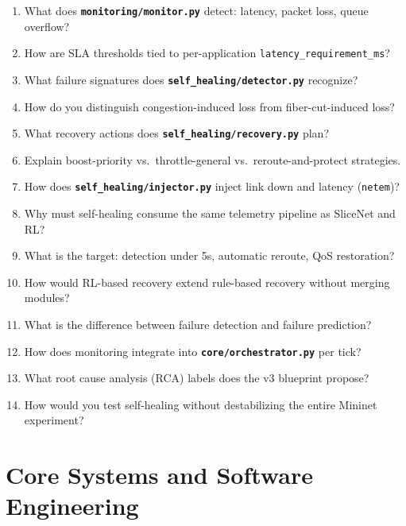 \documentclass[11pt,a4paper]{article}
\newcommand{\proj}[1]{\textbf{\texttt{#1}}}
\begin{document}
\begin{enumerate}
    \item What does \proj{monitoring/monitor.py} detect: latency, packet loss, queue overflow?
    \item How are SLA thresholds tied to per-application \texttt{latency\_requirement\_ms}?
    \item What failure signatures does \proj{self\_healing/detector.py} recognize?
    \item How do you distinguish congestion-induced loss from fiber-cut-induced loss?
    \item What recovery actions does \proj{self\_healing/recovery.py} plan?
    \item Explain boost-priority vs.\ throttle-general vs.\ reroute-and-protect strategies.
    \item How does \proj{self\_healing/injector.py} inject link down and latency (\texttt{netem})?
    \item Why must self-healing consume the same telemetry pipeline as SliceNet and RL?
    \item What is the target: detection under 5s, automatic reroute, QoS restoration?
    \item How would RL-based recovery extend rule-based recovery without merging modules?
    \item What is the difference between failure detection and failure prediction?
    \item How does monitoring integrate into \proj{core/orchestrator.py} per tick?
    \item What root cause analysis (RCA) labels does the v3 blueprint propose?
    \item How would you test self-healing without destabilizing the entire Mininet experiment?
\end{enumerate}

\section{Core Systems and Software Engineering}
\end{document}
